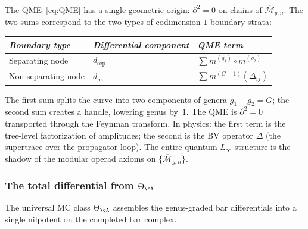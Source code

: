 \begin{remark}[The QME as $\partial^2 = 0$ on moduli]
\label{rem:qme-boundary-squared}
The QME~\eqref{eq:QME} has a single geometric origin:
$\partial^2 = 0$ on chains of $\overline{\mathcal{M}}_{g,n}$.
The two sums correspond to the two types of codimension-$1$
boundary strata:

\smallskip
\begin{center}
\renewcommand{\arraystretch}{1.3}
\begin{tabular}{lll}
\toprule
\emph{Boundary type} & \emph{Differential component}
 & \emph{QME term} \\
\midrule
Separating node & $d_{\mathrm{sep}}$
 & $\sum m^{(g_1)} \circ m^{(g_2)}$ \\
Non-separating node & $d_{\mathrm{ns}}$
 & $\sum m^{(G-1)}(\Delta_{ij})$ \\
\bottomrule
\end{tabular}
\end{center}
\smallskip

\noindent
The first sum splits the curve into two components of genera
$g_1 + g_2 = G$; the second sum creates a handle, lowering genus by~$1$.
The QME is $\partial^2 = 0$ transported through the Feynman transform.
In physics: the first term is the tree-level factorization of
amplitudes; the second is the BV operator $\Delta$ (the supertrace
over the propagator loop). The entire quantum $L_\infty$ structure
is the shadow of the modular operad axioms on
$\{\overline{\mathcal{M}}_{g,n}\}$.
\end{remark}

\subsubsection{The total differential from
\texorpdfstring{$\Theta_\cA$}{Theta-A}}
\label{subsubsec:total-differential-from-theta}

The universal MC class $\Theta_\cA$ assembles the genus-graded bar
differentials into a single nilpotent on the completed bar
complex.

